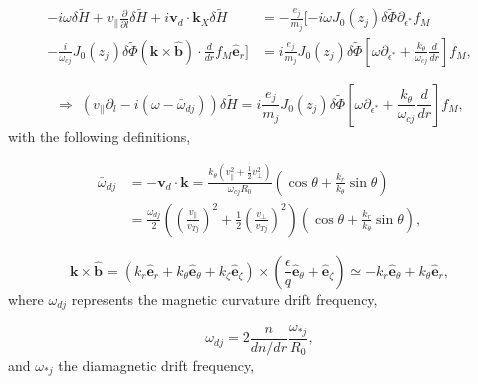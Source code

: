 \documentclass[12pt]{article}
\numberwithin{equation}{section}
\begin{document}
   \begin{equation}
   \begin{aligned}
      -i\omega\delta\widetilde{H} + v_\parallel\frac{\partial}{\partial l}\delta\widetilde{H} + i \bm{v}_d\cdot\bm{k}_X\delta\widetilde{H} &=
      -\frac{e_j}{m_j}[-i\omega J_0(z_j)\delta\widetilde{\Phi}\partial_{\epsilon^*}f_M \\
      -\frac{i}{\omega_{cj}}J_0(z_j)\delta\widetilde{\Phi}(\bm{k}\times\bm{\hat{b}})\cdot\frac{d}{dr} f_M\bm{\hat{e}}_r] &=
      i\frac{e_j}{m_j}J_0(z_j)\delta\widetilde{\Phi}[\omega\partial_{\epsilon^*} + \frac{k_\theta}{\omega_{cj}}\frac{d}{dr}]f_M,
   \end{aligned}
   \end{equation}

   \begin{equation}
      \Rightarrow\; (v_\parallel\partial_l - i(\omega - \bar{\omega}_{dj}))\delta\widetilde{H} =
      i\frac{e_j}{m_j}J_0(z_j)\delta\widetilde{\Phi}[\omega\partial_{\epsilon^*} + \frac{k_\theta}{\omega_{cj}}\frac{d}{dr}]f_M,
   \end{equation}
with the following definitions,

   \begin{equation}
   \begin{aligned}
      \bar{\omega}_{dj} &= -\bm{v}_d\cdot\bm{k} = \frac{k_\theta(v_\parallel^2 + \frac{1}{2}v_\perp^2)}{\omega_{cj}R_0}(\cos\theta
                           + \frac{k_r}{k_\theta}\sin\theta) \\
                        &= \frac{\omega_{dj}}{2}(\left(\frac{v_\parallel}{v_{Tj}}\right)^2 + \frac{1}{2}\left(\frac{v_\perp}{v_{Tj}}\right)^2)
                           (\cos\theta + \frac{k_r}{k_\theta}\sin\theta),  
   \end{aligned}
   \end{equation}

   \begin{equation}
      \bm{k}\times\bm{\hat{b}} = (k_r\bm{\hat{e}}_r + k_\theta\bm{\hat{e}}_\theta + k_\zeta\bm{\hat{e}}_\zeta)\times
      (\frac{\epsilon}{q}\bm{\hat{e}}_\theta + \bm{\hat{e}}_\zeta) \simeq -k_r\bm{\hat{e}}_\theta + k_\theta\bm{\hat{e}}_r,
   \end{equation}
where $\omega_{dj}$ represents the magnetic curvature drift frequency,
   
   \begin{equation}
      \omega_{dj} = 2\frac{n}{dn/dr}\frac{\omega_{*j}}{R_0},
   \end{equation}
and $\omega_{*j}$ the diamagnetic drift frequency,
\end{document}
